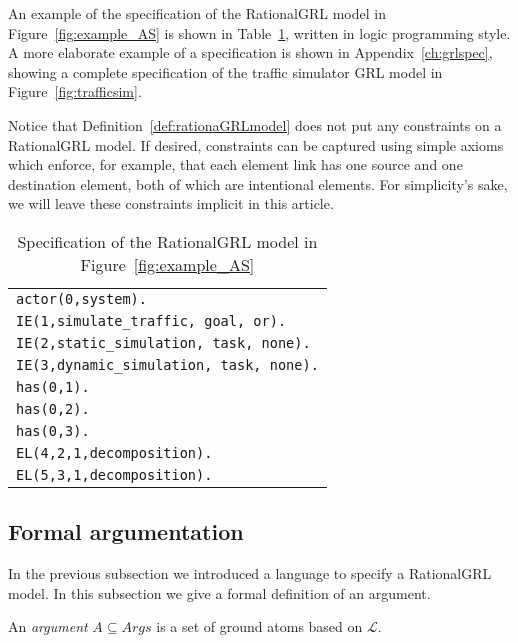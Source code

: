 An example of the specification of the RationalGRL model in Figure~\ref{fig:example_AS} is shown in Table~\ref{table:grl_atom_spec}, written in logic programming style. A more elaborate example of a specification is shown in Appendix~\ref{ch:grlspec}, showing a complete specification of the traffic simulator GRL model in Figure~\ref{fig:trafficsim}.

Notice that Definition~\ref{def:rationaGRLmodel} does not put any constraints on a RationalGRL model. If desired, constraints can be captured using simple axioms which enforce, for example, that each element link has one source and one destination element, both of which are intentional elements. For simplicity's sake, we will leave these constraints implicit in this article. 

\begin{table}[h!]
\centering
\begin{tabularx}{\columnwidth}{|X|}
\hline
\texttt{actor(0,system).}\\
\texttt{IE(1,simulate\_traffic, goal, or).}\\
\texttt{IE(2,static\_simulation, task, none).}\\
\texttt{IE(3,dynamic\_simulation, task, none).}\\
\texttt{has(0,1).}\\ 
\texttt{has(0,2).}\\ 
\texttt{has(0,3).}\\
\texttt{EL(4,2,1,decomposition).}\\
\texttt{EL(5,3,1,decomposition).}\\

\hline
\end{tabularx}
\caption{Specification of the RationalGRL model in Figure~\ref{fig:example_AS}}
\label{table:grl_atom_spec}
\end{table}

\subsection{Formal argumentation}
\label{sect:goalmodeling:argumentationsemantics}

In the previous subsection we introduced a language to specify a RationalGRL model. In this subsection we give a formal definition of an argument.

\begin{definition}[Argument] \label{def:argument}
An \emph{argument} $A\subseteq Args$ is a set of ground atoms based on $\mathcal{L}$.
\end{definition}

